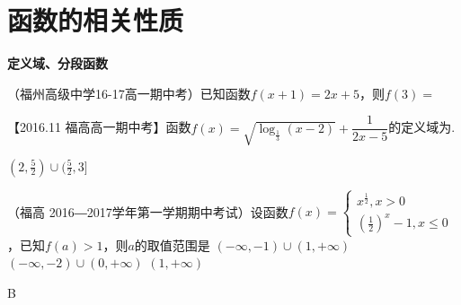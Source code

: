 \section{函数的相关性质}
  \begin{exercise}{\bf 定义域、分段函数}
    \item
      （福州高级中学16-17高一期中考）已知函数$f(x+1)=2x+5$，则$f(3)=$\xz
    \item
      【2016.11 福高高一期中考】函数$f(x)=\sqrt{\log_{\frac13}(x-2)}+\dfrac1{2x-5}$的定义域为\tk.
      \begin{answer}
        $(2,\frac52)\cup(\frac52,3] $
      \end{answer}
    \item
      （福高 2016―2017学年第一学期期中考试）设函数$\displaystyle f(x)=\begin{cases}x^{\frac12},x>0\\(\frac12)^x-1,x\leq0\end{cases} $，已知$f(a)>1$，则$a$的取值范围是\xz
      {$(-\infty,-1)\cup(1,+\infty)$}
      {$(-\infty,-2)\cup(0,+\infty)$}
      {$(1,+\infty)$}
      \begin{answer}
        B
      \end{answer}
  \end{exercise}
